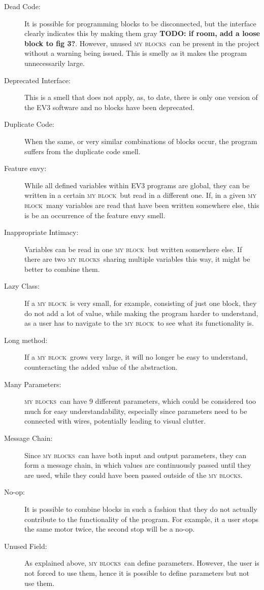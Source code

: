 \documentclass{sig-alternate}
\newcommand{\todo}[1]{\textbf{TODO: #1}}
\newcommand{\mbs}{\textsc{my blocks}}
\newcommand{\mb}{\textsc{my block}}
\begin{document}
\begin{description}
\item[Dead Code:] It is possible for programming blocks to be disconnected, but the interface clearly indicates this by making them gray \todo{if room, add a loose block to fig 3?}. However, unused \mbs~can be present in the project without a warning being issued. This is smelly as it makes the program unnecessarily large.
\item[Deprecated Interface:] This is a smell that does not apply, as, to date, there is only one version of the EV3 software and no blocks have been deprecated.
\item[Duplicate Code:] When the same, or very similar combinations of blocks occur, the program suffers from the duplicate code smell.
\item[Feature envy:] While all defined variables within EV3 programs are global, they can be written in a certain \mb~but read in a different one. If, in a given \mb~many variables are read that have been written somewhere else, this is be an occurrence of the feature envy smell. 
\item[Inappropriate Intimacy:] Variables can be read in one \mb~but written somewhere else. If there are two \mbs~sharing multiple variables this way, it might be better to combine them.
\item[Lazy Class:] If a \mb~is very small, for example, consisting of just one block, they do not add a lot of value, while making the program harder to understand, as a user has to navigate to the \mb~to see what its functionality is.
\item[Long method:] If a \mb~grows very large, it will no longer be easy to understand, counteracting the added value of the abstraction.
\item[Many Parameters:] \mbs~can have 9 different parameters, which could be considered too much for easy understandability, especially since parameters need to be connected with wires, potentially leading to visual clutter.
\item[Message Chain:] Since \mbs~can have both input and output parameters, they can form a message chain, in which values are continuously passed until they are used, while they could have been passed outside of the \mbs.
\item[No-op:] It is possible to combine blocks in such a fashion that they do not actually contribute to the functionality of the program. For example, it a user stops the same motor twice, the second stop will be a no-op.
\item[Unused Field:] As explained above, \mbs~can define parameters. However, the user is not forced to use them, hence it is possible to define parameters but not use them.

\end{description}
\end{document}
